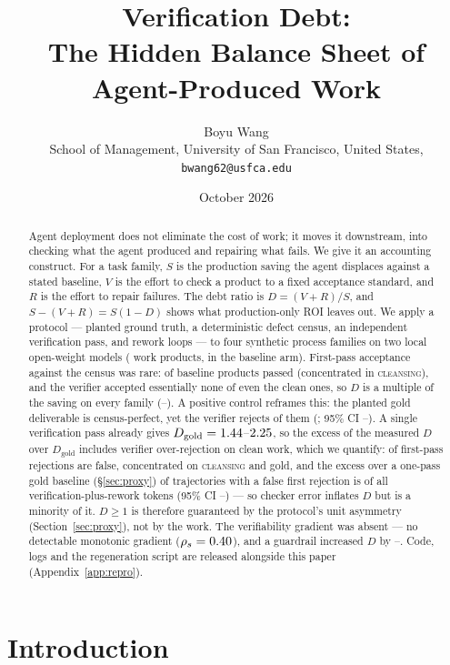 \documentclass[11pt]{article}
\title{\bfseries Verification Debt:\\[2pt]
The Hidden Balance Sheet of Agent-Produced Work}
\author{Boyu Wang\\[2pt]
{\small School of Management, University of San Francisco, United States,
\texttt{bwang62@usfca.edu}}}
\date{October 2026}
\newcommand{\D}{\ensuremath{D}}
\newcommand{\SV}{\ensuremath{S}}
\newcommand{\VV}{\ensuremath{V}}
\newcommand{\RV}{\ensuremath{R}}
\newcommand{\famname}[1]{\textsc{#1}}
\begin{document}
\maketitle

\begin{abstract}
\noindent
Agent deployment does not eliminate the cost of work; it moves it downstream, into checking what
the agent produced and repairing what fails. We give it an accounting construct. For a task family,
$\SV$ is the production saving the agent displaces against a stated baseline, $\VV$ is the effort
to check a product to a fixed acceptance standard, and $\RV$ is the effort to repair failures. The
debt ratio is $\D=(\VV+\RV)/\SV$, and $\SV-(\VV+\RV)=\SV(1-\D)$ shows what production-only ROI
leaves out. We apply a protocol --- planted ground truth, a deterministic defect census, an
independent verification pass, and rework loops --- to four synthetic process families on two local
open-weight models (\VDnumRecords{} work products, \VDnBaseline{} in the baseline arm). First-pass
acceptance against the census was rare: \VDfirstPass{} of \VDnBaseline{} baseline products passed
(concentrated in \famname{cleansing}),
and the verifier accepted essentially none of even the clean ones, so $\D$ is a multiple of the
saving on
every family (\VDDmin--\VDDmax). A positive control reframes this: the planted gold deliverable is
census-perfect, yet the verifier rejects \VDgoldRej{} of them (\VDgoldRejRate{}; 95\% CI
\VDgoldRejLo--\VDgoldRejHi). A
single verification pass already gives $\D_{\text{gold}}=\VDgoldDmin$--$2.25$, so the excess
of the measured $\D$ over $\D_{\text{gold}}$ includes verifier over-rejection on clean work, which
we quantify: \VDdetFalseRej{} of first-pass rejections are false, concentrated on \famname{cleansing}
and gold, and the excess over a one-pass gold baseline (\S\ref{sec:proxy}) of trajectories with a
false first rejection is \VDchkShare{} of all verification-plus-rework tokens (95\% CI
\VDchkShareLo--\VDchkShareHi) --- so checker error inflates $\D$ but is a minority of it. $\D\geq 1$
is therefore guaranteed by the protocol's unit asymmetry (Section~\ref{sec:proxy}), not by
the work. The verifiability gradient was
absent --- no detectable monotonic gradient ($\rho_s=0.40$), and a guardrail increased $\D$ by
\VDguardRiseLo--\VDguardRiseHi. Code, logs and the regeneration script are released alongside
this paper (Appendix~\ref{app:repro}).
\end{abstract}

\section{Introduction}
\end{document}

